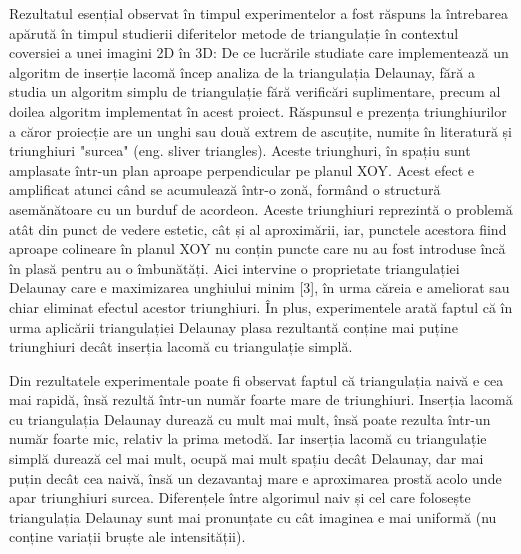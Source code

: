 \documentclass[12pt]{article}
\begin{document}
Rezultatul esențial observat în timpul experimentelor a fost răspuns la întrebarea apărută în timpul studierii diferitelor metode de triangulație în contextul coversiei a unei imagini 2D în 3D: De ce lucrările studiate care implementează un algoritm de inserție lacomă încep analiza de la triangulația Delaunay, fără a studia un algoritm simplu de triangulație fără verificări suplimentare, precum al doilea algoritm implementat în acest proiect. Răspunsul e prezența triunghiurilor a căror proiecție are un unghi sau două extrem de ascuțite, numite în literatură și triunghiuri "surcea" (eng. sliver triangles). Aceste triunghuri, în spațiu sunt amplasate într-un plan aproape perpendicular pe planul XOY. Acest efect e amplificat atunci când se acumulează într-o zonă, formând o structură asemănătoare cu un burduf de acordeon. Aceste triunghiuri reprezintă o problemă atât din punct de vedere estetic, cât și al aproximării, iar, punctele acestora fiind aproape colineare în planul XOY nu conțin puncte care nu au fost introduse încă în plasă pentru au o îmbunătăți. Aici intervine o proprietate triangulației Delaunay care e maximizarea unghiului minim [3], în urma căreia e ameliorat sau chiar eliminat efectul acestor triunghiuri. În plus, experimentele arată faptul că în urma aplicării triangulației Delaunay plasa rezultantă conține mai puține triunghiuri decât inserția lacomă cu triangulație simplă.

Din rezultatele experimentale poate fi observat faptul că triangulația naivă e cea mai rapidă, însă rezultă într-un număr foarte mare de triunghiuri. Inserția lacomă cu triangulația Delaunay durează cu mult mai mult, însă poate rezulta într-un număr foarte mic, relativ la prima metodă. Iar inserția lacomă cu triangulație simplă durează cel mai mult, ocupă mai mult spațiu decât Delaunay, dar mai puțin decât cea naivă, însă un dezavantaj mare e aproximarea prostă acolo unde apar triunghiuri surcea. Diferențele între algorimul naiv și cel care folosește triangulația Delaunay sunt mai pronunțate cu cât imaginea e mai uniformă (nu conține variații bruște ale intensității).
\end{document}

